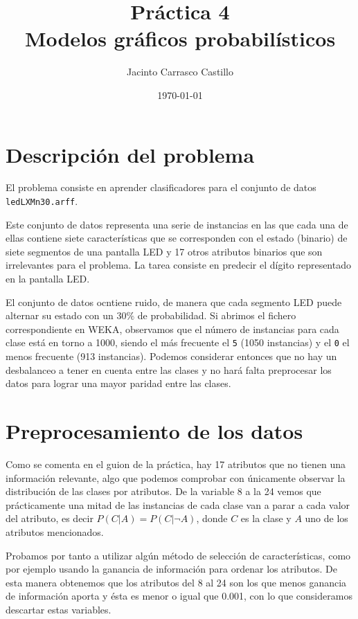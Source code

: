 \documentclass[11pt]{article}
\author{Jacinto Carrasco Castillo}
\date{\today}
\title{Práctica 4\\\medskip
\large Modelos gráficos probabilísticos}
\begin{document}
\maketitle
\tableofcontents



\section{Descripción del problema}
\label{sec:orge8cd25a}

El problema consiste en aprender clasificadores para el conjunto de
datos \texttt{ledLXMn30.arff}.

Este conjunto de datos representa una serie de instancias en las que
cada una de ellas contiene siete características que se corresponden
con el estado (binario) de siete segmentos de una pantalla LED y 17
otros atributos binarios que son irrelevantes para el problema. La
tarea consiste en predecir el dígito representado en la pantalla LED. 

El conjunto de datos ocntiene ruido, de manera que cada segmento LED
puede alternar su estado con un \(30\%\) de probabilidad. Si abrimos el
fichero correspondiente en WEKA, observamos que el número de
instancias para cada clase está en torno a 1000, siendo el más
frecuente el \texttt{5} (1050 instancias) y el \texttt{0} el menos frecuente (913
instancias).  Podemos considerar entonces que no hay un desbalanceo
a tener en cuenta entre las clases y no hará falta preprocesar los
datos para lograr una mayor paridad entre las clases.

\section{Preprocesamiento de los datos}
\label{sec:org7af9969}

Como se comenta en el guion de la práctica, hay 17 atributos que no
tienen una información relevante, algo que podemos comprobar con
únicamente observar la distribución de las clases por atributos. De la
variable 8 a la 24 vemos que prácticamente una mitad de las instancias
de cada clase van a parar a cada valor del atributo, es decir \(P(C|A)
= P(C|¬A)\), donde \(C\) es la clase y \(A\) uno de los atributos
mencionados. 

Probamos por tanto a utilizar algún método de selección de
características, como por ejemplo usando la ganancia de información
para ordenar los atributos. De esta manera obtenemos que los atributos
del 8 al 24 son los que menos ganancia de información aporta y ésta es
menor o igual que 0.001, con lo que consideramos descartar estas
variables. 
\end{document}
